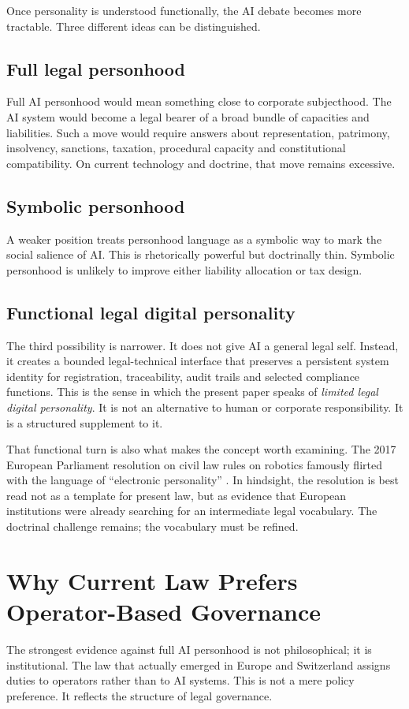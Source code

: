 \documentclass[11pt]{article}
\begin{document}
Once personality is understood functionally, the AI debate becomes more tractable. Three different ideas can be distinguished.

\subsection{Full legal personhood}
Full AI personhood would mean something close to corporate subjecthood. The AI system would become a legal bearer of a broad bundle of capacities and liabilities. Such a move would require answers about representation, patrimony, insolvency, sanctions, taxation, procedural capacity and constitutional compatibility. On current technology and doctrine, that move remains excessive.

\subsection{Symbolic personhood}
A weaker position treats personhood language as a symbolic way to mark the social salience of AI. This is rhetorically powerful but doctrinally thin. Symbolic personhood is unlikely to improve either liability allocation or tax design.

\subsection{Functional legal digital personality}
The third possibility is narrower. It does not give AI a general legal self. Instead, it creates a bounded legal-technical interface that preserves a persistent system identity for registration, traceability, audit trails and selected compliance functions. This is the sense in which the present paper speaks of \emph{limited legal digital personality}. It is not an alternative to human or corporate responsibility. It is a structured supplement to it.

That functional turn is also what makes the concept worth examining. The 2017 European Parliament resolution on civil law rules on robotics famously flirted with the language of ``electronic personality'' \citep{ep2017robotics}. In hindsight, the resolution is best read not as a template for present law, but as evidence that European institutions were already searching for an intermediate legal vocabulary. The doctrinal challenge remains; the vocabulary must be refined.

\section{Why Current Law Prefers Operator-Based Governance}
The strongest evidence against full AI personhood is not philosophical; it is institutional. The law that actually emerged in Europe and Switzerland assigns duties to operators rather than to AI systems. This is not a mere policy preference. It reflects the structure of legal governance.
\end{document}
